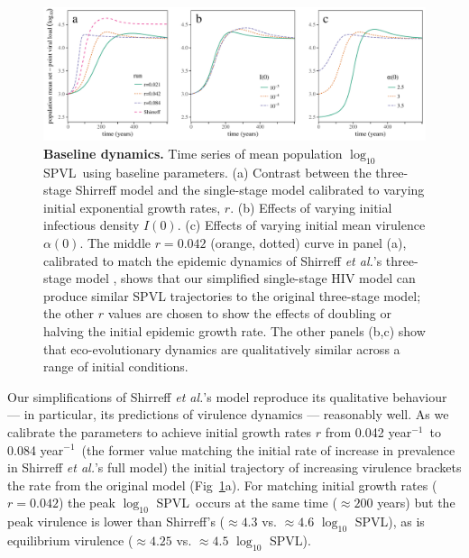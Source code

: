 \documentclass[10pt,letterpaper]{article}
\renewcommand{\figurename}{Fig}
\newcommand{\Lspvl}{$\log_{10}$ SPVL}
\newcommand{\etal}{\textit{et al.}}
\newcommand{\peryear}{year$^{-1}$}
\begin{document}
\begin{figure}[!ht]
\includegraphics[width=\textwidth]{../figures/fig1.pdf}
\caption{\textbf{Baseline dynamics.}
Time series of mean population \Lspvl\ using baseline parameters.
(a) Contrast between the three-stage Shirreff model and the single-stage model calibrated to varying initial exponential growth rates, $r$.
(b) Effects of varying initial infectious density $I(0)$.
(c) Effects of varying initial mean virulence $\alpha(0)$.
The middle $r=0.042$ (orange, dotted) curve in panel (a), calibrated to match the epidemic dynamics of Shirreff \etal's three-stage model \cite{shirreff_transmission_2011}, shows that our simplified single-stage HIV model can produce similar SPVL trajectories to the original three-stage model; the other $r$ values are chosen to show the effects of doubling or halving the initial epidemic growth rate. The other panels (b,c) show that eco-evolutionary dynamics are qualitatively similar across a range of initial conditions.}
\label{fig:panel3}
\end{figure}

Our simplifications of Shirreff \etal's model \cite{shirreff_transmission_2011} reproduce its qualitative behaviour --- in particular, its predictions of virulence dynamics --- reasonably well. As we calibrate the parameters to achieve initial growth rates $r$ from 0.042 \peryear\ to 0.084 \peryear\ (the former value matching the initial rate of increase in prevalence in Shirreff \etal's full model) the initial trajectory of increasing virulence brackets the rate from the original model (\figurename~\ref{fig:panel3}a). 
For matching initial growth rates ($r=0.042$)
the peak \Lspvl\ occurs at the same time ($\approx 200$ years)
but the peak virulence is lower than 
Shirreff's ($\approx 4.3$ vs. $\approx 4.6$ \Lspvl),
as is equilibrium virulence ($\approx 4.25$ vs. $\approx 4.5$ \Lspvl).
\end{document}
